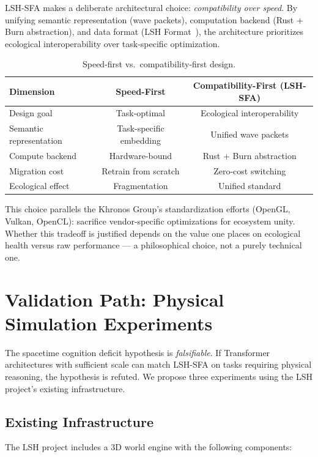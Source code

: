 \documentclass{article}
\begin{document}
LSH-SFA makes a deliberate architectural choice: \textit{compatibility over speed}. By unifying semantic representation (wave packets), computation backend (Rust + Burn abstraction), and data format (LSH Format~\citep{lsh-format}), the architecture prioritizes ecological interoperability over task-specific optimization.

\begin{table}[h]
\centering
\caption{Speed-first vs.\ compatibility-first design.}
\label{tab:philosophy}
\begin{tabular}{lcc}
\toprule
\textbf{Dimension} & \textbf{Speed-First} & \textbf{Compatibility-First (LSH-SFA)} \\
\midrule
Design goal & Task-optimal & Ecological interoperability \\
Semantic representation & Task-specific embedding & Unified wave packets \\
Compute backend & Hardware-bound & Rust + Burn abstraction \\
Migration cost & Retrain from scratch & Zero-cost switching \\
Ecological effect & Fragmentation & Unified standard \\
\end{tabular}
\end{table}

This choice parallels the Khronos Group's standardization efforts (OpenGL, Vulkan, OpenCL): sacrifice vendor-specific optimizations for ecosystem unity. Whether this tradeoff is justified depends on the value one places on ecological health versus raw performance --- a philosophical choice, not a purely technical one.

\section{Validation Path: Physical Simulation Experiments}
\label{sec:validation}

The spacetime cognition deficit hypothesis is \textit{falsifiable}. If Transformer architectures with sufficient scale can match LSH-SFA on tasks requiring physical reasoning, the hypothesis is refuted. We propose three experiments using the LSH project's existing infrastructure.

\subsection{Existing Infrastructure}

The LSH project includes a 3D world engine with the following components:
\end{document}
